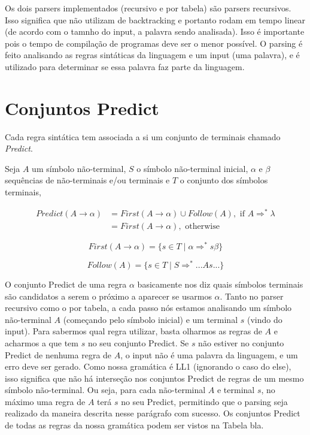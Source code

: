 Os dois parsers implementados (recursivo e por tabela) são parsers recursivos. Isso significa que não utilizam de backtracking e portanto rodam em tempo linear (de acordo com o tamnho do input, a palavra sendo analisada). Isso é importante pois o tempo de compilação de programas deve ser o menor possível. O parsing é feito analisando as regras sintáticas da linguagem e um input (uma palavra), e é utilizado para determinar se essa palavra faz parte da linguagem. 

\section{Conjuntos Predict}
Cada regra sintática tem associada a si um conjunto de terminais chamado \textit{Predict}.

Seja $A$ um símbolo não-terminal, $S$ o símbolo não-terminal inicial, $\alpha$ e $\beta$ sequências de não-terminais e/ou terminais e $T$ o conjunto dos símbolos terminais,

\begin{align*} 
Predict(A \rightarrow \alpha) & = First(A\rightarrow \alpha) \cup Follow(A), \text{ if } A \Rightarrow^* \lambda \\
 & = First(A\rightarrow \alpha), \text{ otherwise}
\end{align*}

\begin{equation*}
First(A \rightarrow \alpha) = \{s \in T \mid \alpha \Rightarrow^* s\beta\}
\end{equation*}

\begin{equation*}
Follow(A) = \{s \in T \mid S \Rightarrow^* ...As...\}
\end{equation*}

O conjunto Predict de uma regra $\alpha$ basicamente nos diz quais símbolos terminais são candidatos a serem o próximo a aparecer se usarmos $\alpha$. Tanto no parser recursivo como o por tabela, a cada passo nós estamos analisando um símbolo não-terminal $A$ (começando pelo símbolo inicial) e um terminal $s$ (vindo do input). Para sabermos qual regra utilizar, basta olharmos as regras de $A$ e acharmos a que tem $s$ no seu conjunto Predict. Se $s$ não estiver no conjunto Predict de nenhuma regra de $A$, o input não é uma palavra da linguagem, e um erro deve ser gerado. Como nossa gramática é LL1 (ignorando o caso do else), isso significa que não há interseção nos conjuntos Predict de regras de um mesmo símbolo não-terminal. Ou seja, para cada não-terminal $A$ e terminal $s$, no máximo uma regra de $A$ terá $s$ no seu Predict, permitindo que o parsing seja realizado da maneira descrita nesse parágrafo com sucesso. Os conjuntos Predict de todas as regras da nossa gramática podem ser vistos na Tabela bla.

